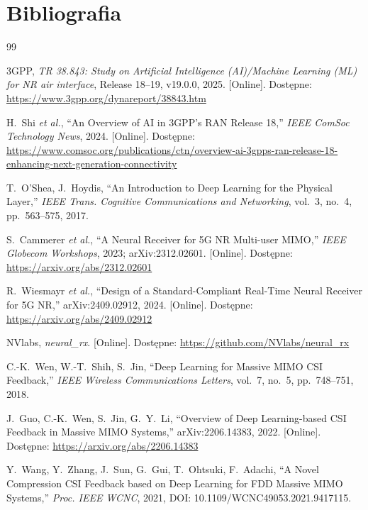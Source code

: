 \documentclass[12pt, a4paper]{article}
\begin{document}
\section{Bibliografia}

\begin{thebibliography}{99}

3GPP, \textit{TR 38.843: Study on Artificial Intelligence (AI)/Machine Learning (ML) for NR air interface}, Release 18--19, v19.0.0, 2025. [Online]. Dostępne: \url{https://www.3gpp.org/dynareport/38843.htm}

H.~Shi \textit{et al.}, ``An Overview of AI in 3GPP's RAN Release 18,'' \textit{IEEE ComSoc Technology News}, 2024. [Online]. Dostępne: \url{https://www.comsoc.org/publications/ctn/overview-ai-3gpps-ran-release-18-enhancing-next-generation-connectivity}

T.~O'Shea, J.~Hoydis, ``An Introduction to Deep Learning for the Physical Layer,'' \textit{IEEE Trans. Cognitive Communications and Networking}, vol.~3, no.~4, pp.~563--575, 2017.

S.~Cammerer \textit{et al.}, ``A Neural Receiver for 5G NR Multi-user MIMO,'' \textit{IEEE Globecom Workshops}, 2023; arXiv:2312.02601. [Online]. Dostępne: \url{https://arxiv.org/abs/2312.02601}

R.~Wiesmayr \textit{et al.}, ``Design of a Standard-Compliant Real-Time Neural Receiver for 5G NR,'' arXiv:2409.02912, 2024. [Online]. Dostępne: \url{https://arxiv.org/abs/2409.02912}

NVlabs, \textit{neural\_rx}. [Online]. Dostępne: \url{https://github.com/NVlabs/neural_rx}

C.-K.~Wen, W.-T.~Shih, S.~Jin, ``Deep Learning for Massive MIMO CSI Feedback,'' \textit{IEEE Wireless Communications Letters}, vol.~7, no.~5, pp.~748--751, 2018.

J.~Guo, C.-K.~Wen, S.~Jin, G.~Y.~Li, ``Overview of Deep Learning-based CSI Feedback in Massive MIMO Systems,'' arXiv:2206.14383, 2022. [Online]. Dostępne: \url{https://arxiv.org/abs/2206.14383}

Y.~Wang, Y.~Zhang, J.~Sun, G.~Gui, T.~Ohtsuki, F.~Adachi, ``A Novel Compression CSI Feedback based on Deep Learning for FDD Massive MIMO Systems,'' \textit{Proc. IEEE WCNC}, 2021, DOI: 10.1109/WCNC49053.2021.9417115.


\end{thebibliography}
\end{document}
